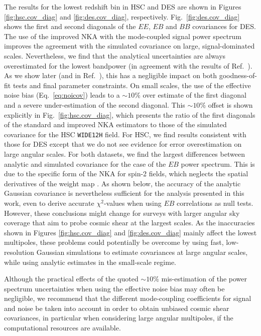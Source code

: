 \documentclass[a4paper,11pt]{article}
\begin{document}
        The results for the lowest redshift bin in HSC and DES are shown in Figures \ref{fig:hsc.cov_diag} and \ref{fig:des.cov_diag}, respectively. Fig.~\ref{fig:des.cov_diag} shows the first and second diagonals of the $EE$, $EB$ and $BB$ covariances for DES. The use of the improved NKA with the mode-coupled signal power spectrum improves the agreement with the simulated covariance on large, signal-dominated scales. Nevertheless, we find that the analytical uncertainties are always overestimated for the lowest bandpower (in agreement with the results of Ref.~\cite{1906.11765}). As we show later (and in Ref.~\cite{1906.11765}), this has a negligible impact on both goodness-of-fit tests and final parameter constraints. On small scales, the use of the effective noise bias (Eq.~\ref{eq:noicov}) leads to a $\sim10\%$ over estimate of the first diagonal and a severe under-estimation of the second diagonal. This $\sim10\%$ offset is shown explicitly in Fig.~\ref{fig:hsc.cov_diag}, which presents the ratio of the first diagonals of the standard and improved NKA estimators to those of the simulated covariance for the HSC \texttt{WIDE12H} field. For HSC, we find results consistent with those for DES except that we do not see evidence for error overestimation on large angular scales. For both datasets, we find the largest differences between analytic and simulated covariance for the case of the $EB$ power spectrum. This is due to the specific form of the NKA for spin-2 fields, which neglects the spatial derivatives of the weight map \citep{1906.11765}. As shown below, the accuracy of the analytic Gaussian covariance is nevertheless sufficient for the analysis presented in this work, even to derive accurate $\chi^2$-values when using $EB$ correlations as null tests. However, these conclusions might change for surveys with larger angular sky coverage that aim to probe cosmic shear at the largest scales. As the inaccuracies shown in Figures \ref{fig:hsc.cov_diag} and \ref{fig:des.cov_diag} mainly affect the lowest multipoles, these problems could potentially be overcome by using fast, low-resolution Gaussian simulations to estimate covariances at large angular scales, while using analytic estimates in the small-scale regime.
        
        Although the practical effects of the quoted $\sim10\%$ mis-estimation of the power spectrum uncertainties when using the effective noise bias may often be negligible, we recommend that the different mode-coupling coefficients for signal and noise be taken into account in order to obtain unbiased cosmic shear covariances, in particular when considering large angular multipoles, if the computational resources are available.
\end{document}
